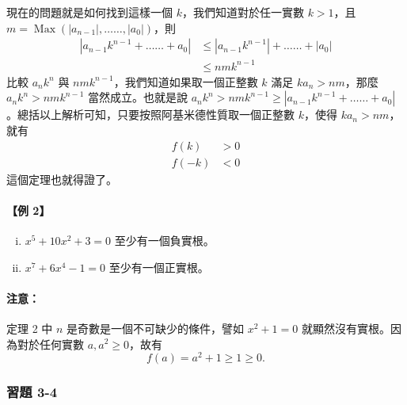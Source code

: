 現在的問題就是如何找到這樣一個 $k$，我們知道對於任一實數 $k > 1$，且 $m = \operatorname{Max}(|a_{n-1}|, \dots\dots, |a_0|)$，則
\begin{align*}
|a_{n-1} k^{n-1} + \dots\dots + a_0| &\le |a_{n-1} k^{n-1}| + \dots\dots + |a_0| \\
&\le n m k^{n-1}
\end{align*}
比較 $a_n k^n$ 與 $n m k^{n-1}$，我們知道如果取一個正整數 $k$ 滿足 $k a_n > n m$，那麼 $a_n k^n > n m k^{n-1}$ 當然成立。也就是說 $a_n k^n > n m k^{n-1} \ge |a_{n-1} k^{n-1} + \dots\dots + a_0|$。總括以上解析可知，只要按照阿基米德性質取一個正整數 $k$，使得 $k a_n > n m$，就有
\begin{align*}
f(k) &> 0 \\
f(-k) &< 0
\end{align*}
這個定理也就得證了。

\paragraph{【例 2】}
\begin{enumerate}[(i)]
    \item $x^5+10x^2+3=0$ 至少有一個負實根。
    \item $x^7+6x^4-1=0$ 至少有一個正實根。
\end{enumerate}

\paragraph{注意：} 定理 2 中 $n$ 是奇數是一個不可缺少的條件，譬如 $x^2+1=0$ 就顯然沒有實根。因為對於任何實數 $a, a^2 \ge 0$，故有
\[
f(a) = a^2+1 \ge 1 \ge 0.
\]

\subsubsection*{習題 3-4}

